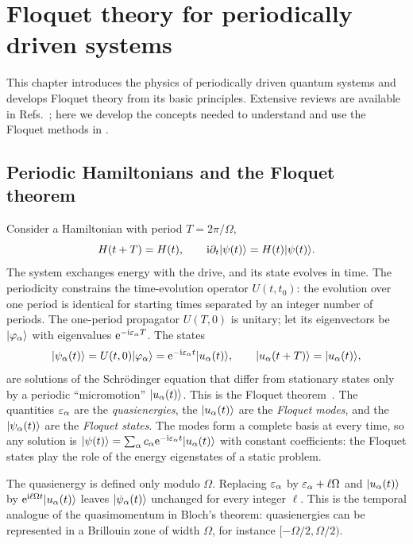 \chapter{Floquet theory for periodically driven systems}\label{ch:floquet}

This chapter introduces the physics of periodically driven quantum systems and
develops Floquet theory from its basic principles. Extensive reviews are available in
Refs.~\cite{grifoni1998driven,kohler2005driven,chu2004beyond,holthaus2016floquet,eckardt2017colloquium,oka2019floquet};
here we develop the concepts needed to understand and use the Floquet methods in \pkg{}.

\section{Periodic Hamiltonians and the Floquet theorem}

Consider a Hamiltonian with period $T=2\pi/\Omega$,
\begin{equation}
  H(t+T)=H(t),\qquad \mathrm{i}\partial_t\lvert \psi(t)\rangle=H(t)\lvert \psi(t)\rangle .
\end{equation}
The system exchanges energy with the drive, and its state evolves in time. The
periodicity constrains the time-evolution operator $U(t,t_0)$: the evolution
over one period is identical for starting times separated by an integer number of periods.
The one-period propagator $U(T,0)$ is unitary; let its eigenvectors be $\lvert \varphi_\alpha\rangle$
with eigenvalues $\mathrm{e}^{-\mathrm{i}\varepsilon_\alpha T}$. The states
\begin{equation}\label{eq:floquet-state}
  \lvert \psi_\alpha(t)\rangle=U(t,0)\lvert \varphi_\alpha\rangle=\mathrm{e}^{-\mathrm{i}\varepsilon_\alpha t}\lvert u_\alpha(t)\rangle,
  \qquad \lvert u_\alpha(t+T)\rangle=\lvert u_\alpha(t)\rangle ,
\end{equation}
are solutions of the Schr\"odinger equation that differ from stationary states only by a
periodic \enquote{micromotion} $\lvert u_\alpha(t)\rangle$. This is the Floquet
theorem~\cite{floquet1883equations,shirley1965solution,zeldovich1967quasienergy,ritus1967shift}.
The quantities $\varepsilon_\alpha$ are the \emph{quasienergies}, the $\lvert u_\alpha(t)\rangle$ are
the \emph{Floquet modes}, and the $\lvert \psi_\alpha(t)\rangle$ are the \emph{Floquet states}. The
modes form a complete basis at every time, so any solution is
$\lvert \psi(t)\rangle=\sum_\alpha c_\alpha\mathrm{e}^{-\mathrm{i}\varepsilon_\alpha t}\lvert u_\alpha(t)\rangle$ with constant
coefficients: the Floquet states play the role of the energy eigenstates of a static
problem.

The quasienergy is defined only modulo $\Omega$. Replacing $\varepsilon_\alpha$ by
$\varepsilon_\alpha+\ell\Omega$ and $\lvert u_\alpha(t)\rangle$ by $\mathrm{e}^{\mathrm{i}\ell\Omega t}\lvert u_\alpha(t)\rangle$
leaves $\lvert \psi_\alpha(t)\rangle$ unchanged for every integer $\ell$. This is the temporal
analogue of the quasimomentum in Bloch's theorem: quasienergies can be represented in a Brillouin zone of
width $\Omega$, for instance $[-\Omega/2,\Omega/2)$.

